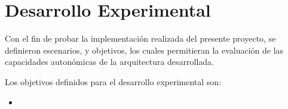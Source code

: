 \section{Desarrollo Experimental} \label{sec:experimental}

Con el fin de probar la implementación realizada del presente proyecto, se definieron escenarios, y objetivos, los cuales permitieran la evaluación de las capacidades autonómicas de la arquitectura desarrollada. 

Los objetivos definidos para el desarrollo experimental son:

\begin{itemize}
    \item 
\end{itemize}



